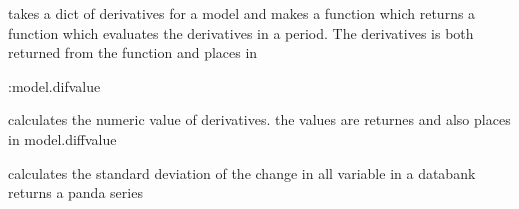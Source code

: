 \documentclass[letterpaper,10pt,english]{sphinxmanual}
\begin{document}

\begin{fulllineitems}
\label{\detokenize{unsorted/modeldiff:modeldiff.rettet}}
\pysigstartsignatures
{}
\pysigstopsignatures
\end{fulllineitems}


\begin{fulllineitems}
\label{\detokenize{unsorted/modeldiff:modeldiff.fouteval}}
\pysigstartsignatures
{}
\pysigstopsignatures
\sphinxAtStartPar
takes a dict of derivatives for a model and makes a function which returns a function which evaluates the
derivatives in a period.
The derivatives is both returned from the function and places in

\sphinxAtStartPar
:model.difvalue

\end{fulllineitems}


\begin{fulllineitems}
\label{\detokenize{unsorted/modeldiff:modeldiff.calculate_diffvalue}}
\pysigstartsignatures
{}
\pysigstopsignatures
\sphinxAtStartPar
calculates the numeric value of derivatives.
the values are returnes and also places in model.diffvalue

\end{fulllineitems}


\begin{fulllineitems}
\label{\detokenize{unsorted/modeldiff:modeldiff.calculate_delta}}
\pysigstartsignatures
{}
\pysigstopsignatures
\sphinxAtStartPar
calculates the standard deviation of the change in all variable in a databank
returns a panda series

\end{fulllineitems}
\end{document}
